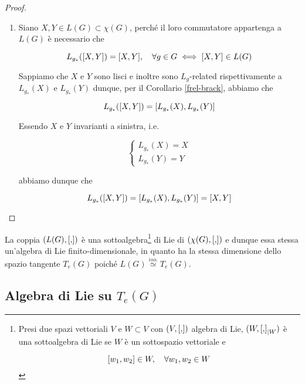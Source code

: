 \begin{proof}
\begin{enumerate}
		\item Siano $ X,Y \in L(G) \subset \chi(G) $, perché il loro commutatore appartenga a $ L(G) $ è necessario che
		
		\begin{equation}
			L_{g_{*}}(\comm{X}{Y}) = \comm{X}{Y} \qcomma \forall g \in G \iff \comm{X}{Y} \in L(G)
		\end{equation}
	
		Sappiamo che $ X $ e $ Y $ sono lisci e inoltre sono $ L_{g} $-related rispettivamente a $ L_{g_{*}}(X) $ e $ L_{g_{*}}(Y) $ dunque, per il Corollario \ref{frel-brack}, abbiamo che
		
		\begin{equation}
			L_{g_{*}}(\comm{X}{Y}) = \comm{L_{g_{*}}(X)}{L_{g_{*}}(Y)}
		\end{equation}
	
		Essendo $ X $ e $ Y $ invarianti a sinistra, i.e.
		
		\begin{equation}
			\begin{cases}
				L_{g_{*}}(X) = X\\
				L_{g_{*}}(Y) = Y
			\end{cases}
		\end{equation}
		
		abbiamo dunque che
		
		\begin{equation}
			L_{g_{*}}(\comm{X}{Y}) = \comm{L_{g_{*}}(X)}{L_{g_{*}}(Y)} = \comm{X}{Y}
		\end{equation}		
	\end{enumerate}
\end{proof}

\begin{corollary}
	La coppia $ (L(G),\comm{}{}) $ è una sottoalgebra\footnote{%
		Presi due spazi vettoriali $ V $ e $ W \subset V $ con $ (V,\comm{}{}) $ algebra di Lie, $ (W,\comm{}{}_{| W}) $ è una sottoalgebra di Lie se $ W $ è un sottospazio vettoriale e
		
		\begin{equation*}
			\comm{w_{1}}{w_{2}} \in W \qcomma \forall w_{1},w_{2} \in W
		\end{equation*}%
	} di Lie di $ (\chi(G),\comm{}{}) $ e dunque essa stessa un'algebra di Lie finito-dimensionale, in quanto ha la stessa dimensione dello spazio tangente $ T_{e}(G) $ poiché $ L(G) \stackrel{iso.}{\simeq} T_{e}(G) $.
\end{corollary}

\subsection{Algebra di Lie su $ T_{e}(G) $}

